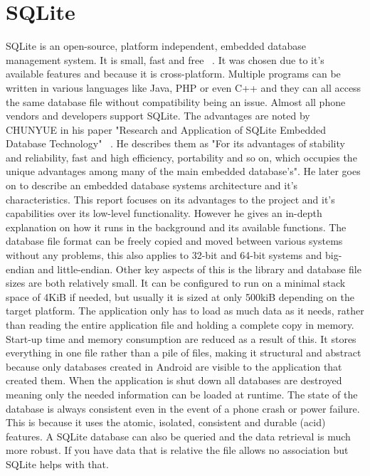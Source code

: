 \section{SQLite}
SQLite is an open-source, platform independent, embedded database management system. It is small, fast and free ~\cite{sqlite}. It was chosen due to it's available features and because it is cross-platform. Multiple programs can be written in various languages like Java, PHP or even C++ and they can all access the same database file without compatibility being an issue. Almost all phone vendors and developers support SQLite. The advantages are noted by CHUNYUE in his paper "Research and Application of SQLite Embedded Database Technology" ~\cite{bi}. He describes them as "For its advantages of stability and reliability, fast and high efficiency, portability and so on, which occupies the unique advantages among many of the main embedded database's". He later goes on to describe an embedded database systems architecture and it's characteristics. This report focuses on its advantages to the project and it's capabilities over its low-level functionality. However he gives an in-depth explanation on how it runs in the background and its available functions.
The database file format can be freely copied and moved between various systems without any problems, this also applies to 32-bit and 64-bit systems and big-endian and little-endian. Other key aspects of this is the library and database file sizes are both relatively small. It can be configured to run on a minimal stack space of 4KiB if needed, but usually it is sized at only 500kiB depending on the target platform. The application only has to load as much data as it needs, rather than reading the entire application file and holding a complete copy in memory. Start-up time and memory consumption are reduced as a result of this. It stores everything in one file rather than a pile of files, making it structural and abstract because only databases created in Android are visible to the application that created them. When the application is shut down all databases are destroyed meaning only the needed information can be loaded at runtime. The state of the database is always consistent even in the event of a phone crash or power failure. This is because it uses the atomic, isolated, consistent and durable (acid) features. A SQLite database can also be queried and the data retrieval is much more robust. If you have data that is relative the file allows no association but SQLite helps with that.

\pagebreak
